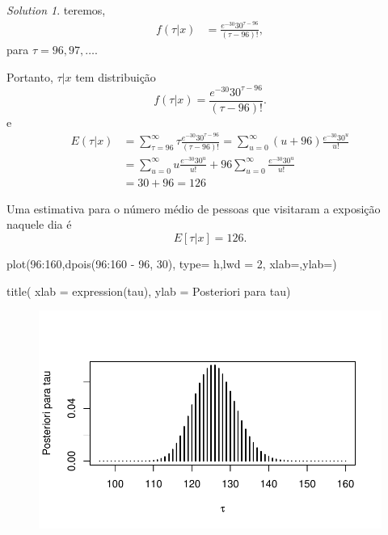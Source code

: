 \documentclass[
  letterpaper,
  DIV=11,
  numbers=noendperiod]{scrreprt}
\newenvironment{Shaded}{\begin{snugshade}}{\end{snugshade}}
\newcommand{\AttributeTok}[1]{\textcolor[rgb]{0.40,0.45,0.13}{#1}}
\newcommand{\DecValTok}[1]{\textcolor[rgb]{0.68,0.00,0.00}{#1}}
\newcommand{\FunctionTok}[1]{\textcolor[rgb]{0.28,0.35,0.67}{#1}}
\newcommand{\NormalTok}[1]{\textcolor[rgb]{0.00,0.23,0.31}{#1}}
\newcommand{\SpecialCharTok}[1]{\textcolor[rgb]{0.37,0.37,0.37}{#1}}
\newcommand{\StringTok}[1]{\textcolor[rgb]{0.13,0.47,0.30}{#1}}
\theoremstyle{definition}
\theoremstyle{definition}
\theoremstyle{remark}
\newtheorem*{solution}{Solution}
\begin{document}
\begin{solution}
teremos, \[\begin{align}
f(\tau|x)&=\frac{e^{-30}30^{\tau-96}}{(\tau-96)!},
\end{align}\] para \(\tau=96,97,\ldots\).

Portanto, \(\tau|x\) tem distribuição
\[f(\tau|x)=\frac{e^{-30}30^{\tau-96}}{(\tau-96)!}.\] e \[\begin{align}
  E(\tau|x)&=\sum_{\tau=96}^{\infty}\tau\frac{e^{-30}30^{\tau-96}}{(\tau-96)!}=\sum_{u=0}^{\infty}(u+96)\frac{e^{-30}30^{u}}{u!}\\
&=\sum_{u=0}^{\infty}u\frac{e^{-30}30^{u}}{u!}+96\sum_{u=0}^{\infty}\frac{e^{-30}30^{u}}{u!}\\
&=30+96=126
  \end{align}\]

Uma estimativa para o número médio de pessoas que visitaram a exposição
naquele dia é \[E[\tau|x]=126.\]

\begin{Shaded}
\begin{Highlighting}[]
\FunctionTok{plot}\NormalTok{(}\DecValTok{96}\SpecialCharTok{:}\DecValTok{160}\NormalTok{,}\FunctionTok{dpois}\NormalTok{(}\DecValTok{96}\SpecialCharTok{:}\DecValTok{160} \SpecialCharTok{{-}} \DecValTok{96}\NormalTok{, }\DecValTok{30}\NormalTok{), }\AttributeTok{type=} \StringTok{\textquotesingle{}h\textquotesingle{}}\NormalTok{,}\AttributeTok{lwd =} \DecValTok{2}\NormalTok{, }\AttributeTok{xlab=}\StringTok{\textquotesingle{}\textquotesingle{}}\NormalTok{,}\AttributeTok{ylab=}\StringTok{\textquotesingle{}\textquotesingle{}}\NormalTok{)}

\FunctionTok{title}\NormalTok{( }\AttributeTok{xlab =} \FunctionTok{expression}\NormalTok{(tau), }\AttributeTok{ylab =} \StringTok{\textquotesingle{}Posteriori para tau\textquotesingle{}}\NormalTok{)}
\end{Highlighting}
\end{Shaded}

\begin{figure}[H]

{\centering \includegraphics{intro_files/figure-pdf/fig-poissonExposicao1-1.pdf}

}
\end{figure}
\end{solution}
\end{document}
